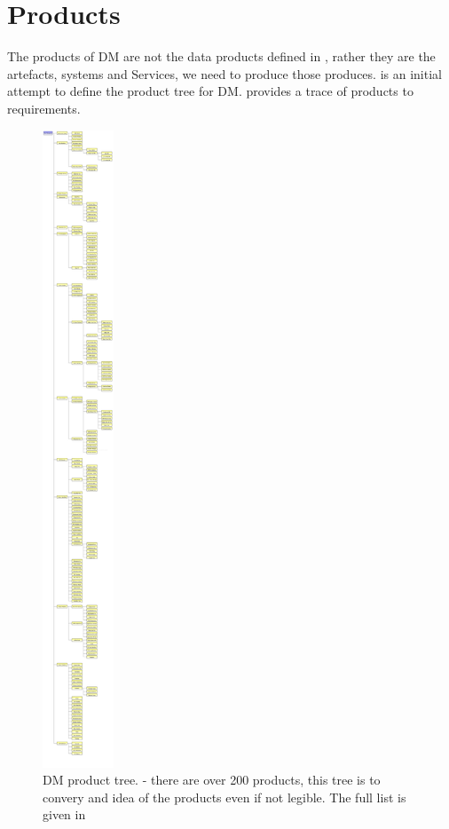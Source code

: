 \section{Products \label{sect:products}}

The products of DM are not the data products defined in , rather they are the artefacts, systems and Services,  we need to produce those produces.  is an initial attempt to define the product tree for DM.  provides a trace of products to requirements. 

\begin{figure}[htbp]
	\begin{center}
		 \includegraphics[height=19cm]{ProductTree}
		 \caption{DM product tree. \label{fig:prods}- there are over 200 products, this tree is to convery and idea of the products even if not legible. The full list is given in }
	 \end{center}
 \end{figure}



